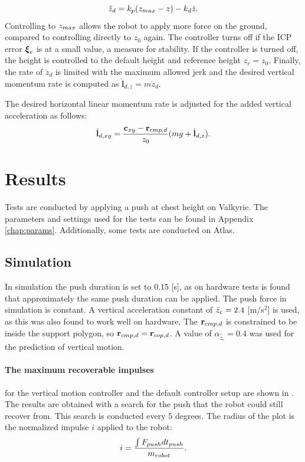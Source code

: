 \begin{equation}
	\ddot{z}_d = k_p(z_{max}-z)-k_d\dot{z}.
\end{equation}
Controlling to $z_{max}$ allows the robot to apply more force on the ground, compared to controlling directly to $z_0$ again. The controller turns off if the \ac{ICP} error $\boldsymbol{\xi}_e$ is at a small value, a measure for stability. If the controller is turned off, the height is controlled to the default height and reference height $z_r=z_0$. Finally, the rate of $\ddot{z}_d$ is limited with the maximum allowed jerk and the desired vertical momentum rate is computed as $\dot{\mathbf{l}}_{d,z}=m\ddot{z}_d$. 

The desired horizontal linear momentum rate is adjusted for the added vertical acceleration as follows:
\begin{equation}
    \dot{\mathbf{l}}_{d,xy}= \frac{\mathbf{c}_{xy}-\mathbf{r}_{cmp,d}}{z_0}(mg+\dot{\mathbf{l}}_{d,z}).
\end{equation}

\section{Results}
Tests are conducted by applying a push at chest height on Valkyrie. The parameters and settings used for the tests can be found in Appendix \ref{chap:params}. Additionally, some tests are conducted on Atlas.

\subsection{Simulation}
In simulation the push duration is set to $0.15$ [s], as on hardware tests is found that approximately the same push duration can be applied. The push force in simulation is constant. A vertical acceleration constant of $\ddot{z}_{c}=2.4$ [m/s$^2$] is used, as this was also found to work well on hardware. The $\mathbf{r}_{cmp,d}$ is constrained to be inside the support polygon, so $\mathbf{r}_{cmp,d}=\mathbf{r}_{cop,d}$. A value of $\alpha_{\hat{\ddot{z}}_{c}}=0.4$ was used for the prediction of vertical motion.

\paragraph{The maximum recoverable impulses} for the vertical motion controller and the default controller setup are shown in . The results are obtained with a search for the push that the robot could still recover from. This search is conducted every $5$ degrees. The radius of the plot is the normalized impulse $i$ applied to the robot:
\begin{equation}
	i = \frac{\int F_{push} dt_{push}}{m_{robot}}.
\end{equation}


